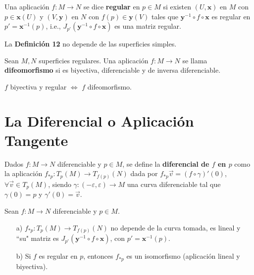 \documentclass[twoside]{report}
\begin{document}
\begin{defi}
Una aplicaci\'on $f: M\rightarrow N$ se dice \textbf{regular} en $p\in M$ si existen $(U,\textbf{x})$ en $M$ con $p \in \textbf{x}(U)$ y $(V,\textbf{y})$ en $N$ con $f(p) \in \textbf{y}(V)$ tales que $\textbf{y}^{-1}\circ f \circ \textbf{x}$ es regular en $p' = \textbf{x}^{-1}(p)$, i.e., $J_{p'}(\textbf{y}^{-1}\circ f \circ \textbf{x})$ es una matriz regular.
\end{defi}

\begin{nota}
La \textup{\textbf{Definici\'on 12}} no depende de las superficies simples.
\end{nota}

\begin{defi}
Sean $M,N$ superficies regulares. Una aplicaci\'on $f:M\to N$ se llama \textbf{difeomorfismo} si es biyectiva, diferenciable y de inversa diferenciable.
\end{defi}

\begin{nota}
$f$ biyectiva y regular $\Leftrightarrow$ $f$ difeomorfismo.
\end{nota}

\section{La Diferencial o Aplicaci\'on Tangente}

\begin{defi}
Dados $f:M \to N$ diferenciable y $p\in M$, se define la \textbf{diferencial de $f$ en $p$} como la aplicaci\'on $f_{*p}: T_p (M)\rightarrow T_{f(p)}(N)$ dada por $f_{*p}\overrightarrow{v}=(f\circ\gamma)'(0)$, $\forall \overrightarrow{v}\in T_p(M)$, siendo $\gamma:(-\varepsilon,\varepsilon)\to M$ una curva diferenciable tal que $\gamma(0)=p$ y $\gamma'(0)=\overrightarrow{v}$.
\end{defi}


\begin{teorema}
Sean $f:M\rightarrow N$ diferenciable y $p\in M$.
\begin{itemize}

\item [a)]
$f_{*p}: T_p (M)\rightarrow T_{f(p)}(N)$ no depende de la curva tomada, es lineal y ``su" matriz es $J_{p'}(\textbf{y}^{-1}\circ f \circ \textbf{x})$, con $p'= \textbf{x}^{-1}(p)$.
\item [b)]
Si $f$ es regular en $p$, entonces $f_{*p}$ es un isomorfismo (aplicaci\'on lineal y biyectiva).
\end{itemize}
\end{teorema}
\end{document}
